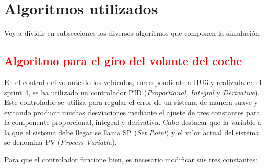 \section{Algoritmos utilizados}

Voy a dividir en subsecciones los diversos algoritmos que componen la simulación:

\subsection{\textcolor{red}{Algoritmo para el giro del volante del coche}}

En el control del volante de los vehículos, correspondiente a HU3 y realizada en el sprint 4, se ha utilizado un controlador PID (\textit{Proportional, Integral} y \textit{Derivative}). Este controlador se utiliza para regular el error de un sistema de manera suave y evitando producir muchas desviaciones mediante el ajuste de tres constantes para la componente proporcional, integral y derivativa. Cabe destacar que la variable a la que el sistema debe llegar se llama SP (\textit{Set Point}) y el valor actual del sistema se denomina PV (\textit{Process Variable}). 

\bigskip

Para que el controlador funcione bien, es necesario modificar sus tres constantes: 

